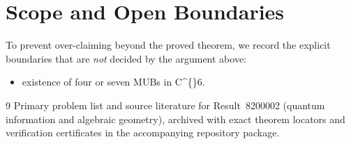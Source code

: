 \documentclass[10pt,reqno]{amsart}
\theoremstyle{definition}
\begin{document}
\section{Scope and Open Boundaries}

To prevent over-claiming beyond the proved theorem, we record the explicit boundaries that are \emph{not} decided by the argument above:
\begin{itemize}
  \item existence of four or seven MUBs in C\textasciicircum\{\}6.
\end{itemize}

\begin{thebibliography}{9}
Primary problem list and source literature for Result~8200002 (quantum information and algebraic geometry), archived with exact theorem locators and verification certificates in the accompanying repository package.
\end{thebibliography}
\end{document}
